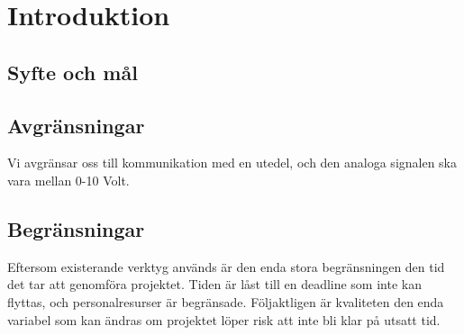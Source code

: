 \documentclass[11pt,a4paper,oneside]{book}
\begin{document}


\tableofcontents

\chapter{Introduktion}


\section{Syfte och mål} %


\section{Avgränsningar}
Vi avgränsar oss till kommunikation med en utedel, och den analoga signalen ska vara mellan 0-10 Volt.\\

\section{Begränsningar} %
Eftersom existerande verktyg används är den enda stora begränsningen den tid det tar att genomföra 
projektet. Tiden är låst till en deadline som inte kan flyttas, och personalresurser är begränsade. 
Följaktligen är kvaliteten den enda variabel som kan ändras om projektet löper risk att inte bli klar 
på utsatt tid.
\newpage
\end{document}
